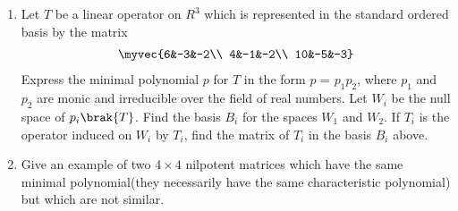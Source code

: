 \renewcommand{\theequation}{\theenumi}
\renewcommand{\thefigure}{\theenumi}
\begin{enumerate}[label=\thesubsection.\arabic*.,ref=\thesubsection.\theenumi]

\item %
Let $T$ be a linear operator on $R^3$ which is represented in the standard ordered basis by the matrix 
\begin{align}
    \myvec{6&-3&-2\\
           4&-1&-2\\
           10&-5&-3}
\end{align}
Express the minimal polynomial $p$ for $T$ in the form $p$ = $p_1p_2$, where $p_1$ and $p_2$ are monic and irreducible over the field of real numbers. Let $W_i$ be the null space of $p_i\brak{T}$. Find the basis $B_i$ for the spaces $W_1$ and $W_2$. If $T_i$ is the operator induced on $W_i$ by $T_i$, find the matrix of $T_i$ in the basis $B_i$ above.
%
%
\solution

\item Give an example of two $4\times 4$ nilpotent matrices which have the same minimal polynomial(they necessarily have the same characteristic polynomial) but which are not similar. 
%
\solution

\end{enumerate}
